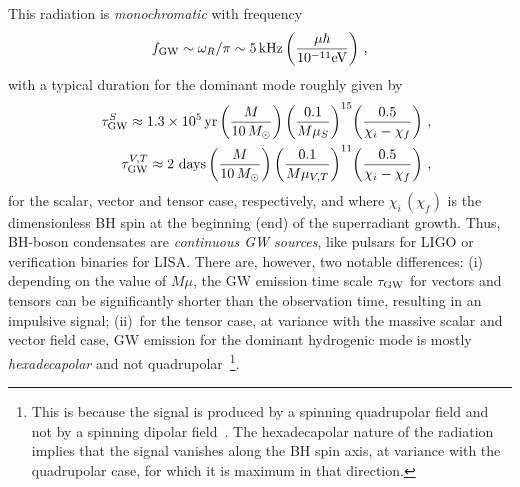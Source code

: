 \documentclass[11pt]{article}
\numberwithin{equation}{section} %
\begin{document}
This radiation is \emph{monochromatic} with frequency
\begin{equation}
 f_{\rm GW}\sim \omega_R/\pi \sim 5\,{\rm kHz}\left(\frac{\mu \hbar}{10^{-11}{\rm eV}}\right)\,, \label{eq:frequency_SR}
\end{equation}
with a typical duration for the dominant mode roughly given by~\cite{Yoshino:2013ofa,Brito:2017zvb,Baryakhtar:2017ngi,Siemonsen:2019ebd,Brito:2020lup}
%
%
\begin{eqnarray}
&&\tau_{\rm GW}^{S} \approx 1.3 \times 10^{5}\, {\rm yr} \left(\frac{M}{10\, M_{\odot}}\right) \left(\frac{0.1}{M\mu_S}\right)^{15}\hspace{-2pt} \left(\frac{0.5}{\chi_i-\chi_f}\right)\,, \label{eq:tgw_sca}\\
&&\tau_{\rm GW}^{V,T}\approx 2\,\, {\rm days} \left(\frac{M}{10\, M_{\odot}}\right) \left(\frac{0.1}{M\mu_{V,T}}\right)^{11}\hspace{-2pt} \left(\frac{0.5}{\chi_i-\chi_f}\right)\,,\label{eq:tgw_vec}
\end{eqnarray}
%
%
for the scalar, vector and tensor case, respectively, and where $\chi_{i}\,(\chi_{f})$ is the dimensionless BH spin at the beginning (end) of the superradiant growth.
%
Thus, BH-boson condensates are \emph{continuous GW sources},
like pulsars for LIGO or verification binaries for LISA. There are, however, two notable differences: (i) depending on the value of $M\mu$, the GW emission time scale 
$\tau_{\rm GW}$ for vectors and tensors can be significantly shorter than the observation time, resulting in an impulsive signal; (ii)~for the tensor case, at variance with the massive scalar and vector field case, GW emission for the dominant hydrogenic mode is mostly \emph{hexadecapolar} and not quadrupolar~\footnote{This is because the signal is produced by a spinning quadrupolar field and not by a spinning dipolar field~\cite{Brito:2020lup}. The hexadecapolar nature of the radiation implies that the signal vanishes along the BH spin axis, at variance with the quadrupolar case, for which it is maximum in that direction.}.
\end{document}
